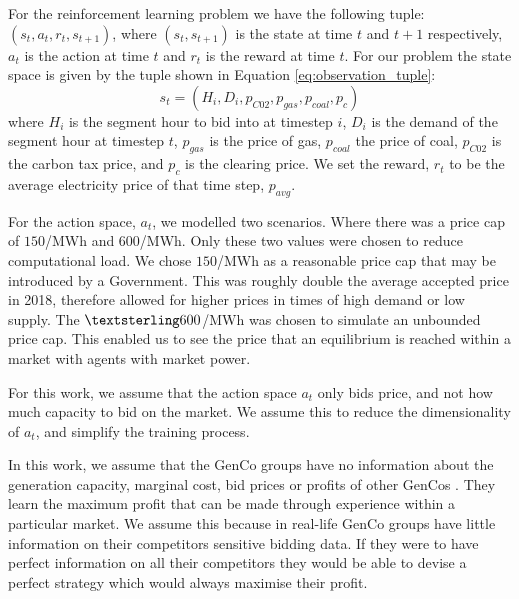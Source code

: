 For the reinforcement learning problem we have the following tuple: $(s_t,a_t,r_t,s_{t+1})$, where $(s_t, s_{t+1})$ is the state at time $t$ and $t+1$ respectively, $a_t$ is the action at time $t$ and $r_t$ is the reward at time $t$. For our problem the state space is given by the tuple shown in Equation \ref{eq:observation_tuple}:
\begin{equation}
\label{eq:observation_tuple}
s_t=(H_i,D_i,p_{C02},p_{gas},p_{coal},p_{c})
\end{equation}
\noindent where $H_i$ is the segment hour to bid into at timestep $i$, $D_i$ is the demand of the segment hour at timestep $t$, $p_{gas}$ is the price of gas, $p_{coal}$ the price of coal, $p_{C02}$ is the carbon tax price, and $p_{c}$ is the clearing price. We set the reward, $r_t$ to be the average electricity price of that time step, $p_{avg}$.

For the action space, $a_t$, we modelled two scenarios. Where there was a price cap of \textsterling$150$/MWh and \textsterling$600$/MWh. Only these two values were chosen to reduce computational load. We chose \textsterling$150$/MWh as a reasonable price cap that may be introduced by a Government. This was roughly double the average accepted price in 2018, therefore allowed for higher prices in times of high demand or low supply. The $\textsterling 600$/MWh was chosen to simulate an unbounded price cap. This enabled us to see the price that an equilibrium is reached within a market with agents with market power. 

For this work, we assume that the action space $a_t$ only bids price, and not how much capacity to bid on the market. We assume this to reduce the dimensionality of $a_t$, and simplify the training process.

In this work, we assume that the GenCo groups have no information about the generation capacity, marginal cost, bid prices or profits of other GenCos \cite{EsmaeiliAliabadi2017}. They learn the maximum profit that can be made through experience within a particular market. We assume this because in real-life GenCo groups have little information on their competitors sensitive bidding data. If they were to have perfect information on all their competitors they would be able to devise a perfect strategy which would always maximise their profit.


